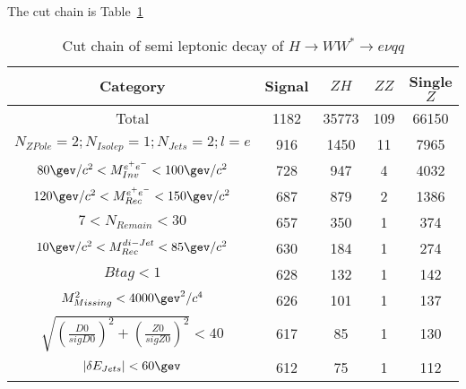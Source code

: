 \documentclass[11pt,a4paper]{cepcnote}
\begin{document}
The cut chain is Table~\ref{tab:semievqq}
\begin{table}[H]
  \begin{center}
    \begin{tabular}{ccccc}
      \hline \hline
      \multicolumn{1}{c}{Category}      & \multicolumn{1}{c}{Signal}&\multicolumn{1}{c}{$ZH$}&\multicolumn{1}{c}{$ZZ$}&\multicolumn{1}{c}{Single $Z$}\\ 
      \hline
      Total 	      	 									&   1182	& 35773	&	109	& 66150\\
      $N_{ZPole}=2; N_{Isolep}=1; N_{Jets} =2; l = e$		&   916		& 1450	&	11	& 7965\\
      $80\gev/c^2 < M_{Inv}^{e^+e^-} < 100\gev/c^2$    		&   728		& 947	&	4	& 4032\\
	  $120\gev/c^2 < M_{Rec}^{e^+e^-} < 150\gev/c^2$   		&   687 	& 879	&	2	& 1386\\
	  $7 < N_{Remain} < 30$									&	657		& 350	& 	1	& 374\\
	  $10\gev/c^2 < M_{Rec}^{di-Jet} < 85\gev/c^2 $			&	630		& 184	&	1	& 274\\
	  $Btag < 1$											&	628		& 132	& 	1	& 142\\
	  $M_{Missing}^2 < 4000\gev^2/c^4$						&   626		& 101	&	1	& 137\\
	  $\sqrt{(\frac{D0}{sigD0})^2+(\frac{Z0}{sigZ0})^2} < 40$&  617   	&  85 	&	1	& 130\\
	  $|\delta E_{Jets}| <60\gev$							&	612		&  75	&	1	& 112\\
      \hline \hline
    \end{tabular}
  \caption[Monte Carlo purities in the single lepton sample]{%
    Cut chain of semi leptonic decay of $H\rightarrow WW^* \rightarrow e\nu qq$}
  \label{tab:semievqq}
  \end{center}
\end{table}

%
%
\end{document}
